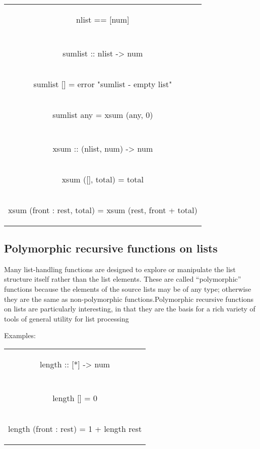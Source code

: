 \documentclass[11pt]{article}
\begin{document}
\\
\begin{tabular}{ |c| } 
 \hline
\begin{flushleft} nlist == [num] \end{flushleft}\\
\\
\begin{flushleft}sumlist :: nlist -> num\end{flushleft}\\
\begin{flushleft}sumlist [] = error "sumlist - empty list"\end{flushleft}\\
\begin{flushleft}sumlist any = xsum (any, 0)\end{flushleft}\\
\\
\begin{flushleft}xsum :: (nlist, num) -> num\end{flushleft}\\
\begin{flushleft}xsum ([], total) = total\end{flushleft}\\
\begin{flushleft}xsum (front : rest, total) = xsum (rest, front + total)\end{flushleft}\\
\hline
\end{tabular}


\subsection{Polymorphic recursive functions on lists}

Many list-handling functions are designed to explore or manipulate the list structure
itself rather than the list elements. These are called “polymorphic” functions
because the elements of the source lists may be of any type; otherwise they are the
same as non-polymorphic functions.Polymorphic recursive functions
on lists are particularly interesting, in that they are the basis for a rich variety
of tools of general utility for list processing

Examples:\\

\begin{tabular}{ |c| } 
 \hline
\begin{flushleft}length :: [*] -> num \end{flushleft}\\
\\
\begin{flushleft}length [] = 0\end{flushleft}\\
\begin{flushleft}length (front : rest) = 1 + length rest\end{flushleft}\\
\hline
\end{tabular}
\\
\end{document}
